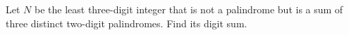 Let $N$ be the least three-digit integer that is not a palindrome but is a sum of three distinct two-digit palindromes. Find its digit sum.
